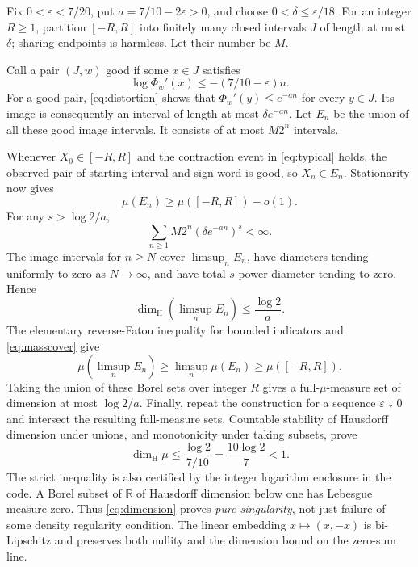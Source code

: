 \documentclass[11pt]{article}
\theoremstyle{remark}
\newcommand{\R}{\mathbb R}
\newcommand{\dimH}{\operatorname{dim}_{\mathrm H}}
\begin{document}
Fix $0<\varepsilon<7/20$, put $a=7/10-2\varepsilon>0$, and choose $0<\delta\le\varepsilon/18$. For an integer $R\ge1$, partition $[-R,R]$ into finitely many closed intervals $J$ of length at most $\delta$; sharing endpoints is harmless. Let their number be $M$.

Call a pair $(J,w)$ good if some $x\in J$ satisfies
\[
\log\Phi_w'(x)\le-(7/10-\varepsilon)n.
\]
For a good pair, \eqref{eq:distortion} shows that $\Phi_w'(y)\le e^{-an}$ for every $y\in J$. Its image is consequently an interval of length at most $\delta e^{-an}$. Let $E_n$ be the union of all these good image intervals. It consists of at most $M2^n$ intervals.

Whenever $X_0\in[-R,R]$ and the contraction event in \eqref{eq:typical} holds, the observed pair of starting interval and sign word is good, so $X_n\in E_n$. Stationarity now gives
\begin{equation}\label{eq:masscover}
\mu(E_n)\ge\mu([-R,R])-o(1).
\end{equation}
For any $s>\log2/a$,
\[
\sum_{n\ge1}M2^n(\delta e^{-an})^s<\infty.
\]
The image intervals for $n\ge N$ cover $\limsup_n E_n$, have diameters tending uniformly to zero as $N\to\infty$, and have total $s$-power diameter tending to zero. Hence
\[
\dimH(\limsup_n E_n)\le\frac{\log2}{a}.
\]
The elementary reverse-Fatou inequality for bounded indicators and \eqref{eq:masscover} give
\[
\mu(\limsup_nE_n)\ge\limsup_n\mu(E_n)\ge\mu([-R,R]).
\]
Taking the union of these Borel sets over integer $R$ gives a full-$\mu$-measure set of dimension at most $\log2/a$. Finally, repeat the construction for a sequence $\varepsilon\downarrow0$ and intersect the resulting full-measure sets. Countable stability of Hausdorff dimension under unions, and monotonicity under taking subsets, prove
\begin{equation}\label{eq:dimension}
\dimH\mu\le\frac{\log2}{7/10}=\frac{10\log2}{7}<1.
\end{equation}
The strict inequality is also certified by the integer logarithm enclosure in the code. A Borel subset of $\R$ of Hausdorff dimension below one has Lebesgue measure zero. Thus \eqref{eq:dimension} proves \emph{pure singularity}, not just failure of some density regularity condition. The linear embedding $x\mapsto(x,-x)$ is bi-Lipschitz and preserves both nullity and the dimension bound on the zero-sum line.
\end{document}
